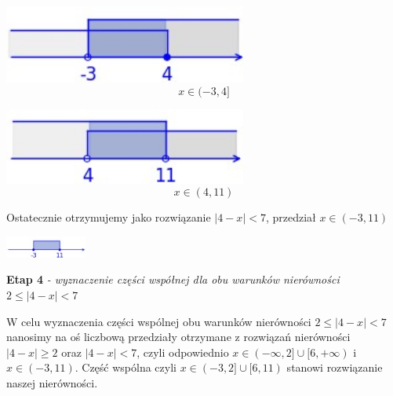 \documentclass[12pt, a4paper]{report}
\begin{document}
    \begin{center}
        \begin{minipage}{0.3\textwidth}
            \centering
            \includegraphics[width=0.6\textwidth]{fig_5.jpg}
            \[x \in (-3,4]\]
        \end{minipage}
        \hspace{0.01\textwidth}
        \begin{minipage}{0.01\textwidth}
        \end{minipage}
        \hspace{0.1\textwidth}
        \begin{minipage}{0.3\textwidth}
            \centering
            \includegraphics[width=0.6\textwidth]{fig_6.jpg}
            \[x \in (4, 11)\]
        \end{minipage}
    \end{center}

    \bigskip

    \noindent
    Ostatecznie otrzymujemy jako rozwiązanie $|4 - x| < 7$, przedział $x \in (-3, 11)$

    \begin{center}
        \includegraphics[width=0.2\textwidth]{fig_7.jpg}
    \end{center}

    \vspace{15pt}                            %

    \noindent
    \textbf{Etap 4}
    \emph{ - wyznaczenie części współnej dla obu warunków nierówności $2 \leq |4 - x| < 7$}

    \noindent
    W celu wyznaczenia części wspólnej obu warunków nierówności $2 \leq |4 - x| < 7$ nanosimy na oś liczbową przedziały otrzymane z rozwiązań nierówności $|4 - x| \geq 2$ oraz $|4 - x| < 7$, czyli odpowiednio $x \in (-\infty, 2] \cup [6, +\infty)$ i $x \in (-3, 11)$. Część wspólna czyli $x \in (-3, 2] \cup [6, 11)$ stanowi rozwiązanie naszej nierówności.
\end{document}
